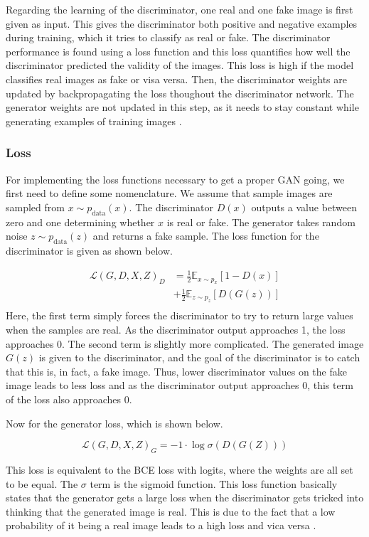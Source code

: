 \documentclass[12pt, fleqn, titlepage]{article}
\begin{document}
Regarding the learning of the discriminator, one real and one fake image is first given as input. This gives the discriminator both positive and negative examples during training, which it tries to classify as real or fake. The discriminator performance is found using a loss function and this loss quantifies how well the discriminator predicted the validity of the images. This loss is high if the model classifies real images as fake or visa versa. Then, the discriminator weights are updated by backpropagating the loss thoughout the discriminator network. The generator weights are not updated in this step, as it needs to stay constant while generating examples of training images \cite{developers.google_discriminator, developers.google_training}.

\subsubsection{Loss}
For implementing the loss functions necessary to get a proper GAN going, we first need to define some nomenclature. We assume that sample images are sampled from $x \sim p_{\text {data}}(x)$. The discriminator $D(x)$ outputs a value between zero and one determining whether $x$ is real or fake. The generator takes random noise $z \sim p_{\text {data}}(z)$ and returns a fake sample. The loss function for the discriminator is given as shown below.

\[\begin{aligned}
	\mathcal{L}\left(G, D, X, Z\right)_D &=\frac{1}{2} \mathbb{E}_{x \sim p_{x}}[1-D(x)] \\
	&+\frac{1}{2} \mathbb{E}_{z \sim p_{z}}[D(G(z))] \\
\end{aligned}\]
Here, the first term simply forces the discriminator to try to return large values when the samples are real. As the discriminator output approaches 1, the loss approaches 0. The second term is slightly more complicated. The generated image $G(z)$ is given to the discriminator, and the goal of the discriminator is to catch that this is, in fact, a fake image. Thus, lower discriminator values on the fake image leads to less loss and as the discriminator output approaches 0, this term of the loss also approaches 0.

Now for the generator loss, which is shown below.

\[\mathcal{L}\left(G, D, X, Z\right)_G=-1 \cdot \log \sigma\left(D(G(Z))\right)\]

This loss is equivalent to the BCE loss with logits, where the weights are all set to be equal. The $\sigma$ term is the sigmoid function. This loss function basically states that the generator gets a large loss when the discriminator gets tricked into thinking that the generated image is real. This is due to the fact that a low probability of it being a real image leads to a high loss and vica versa \cite{bcewithlogits}.
\end{document}
